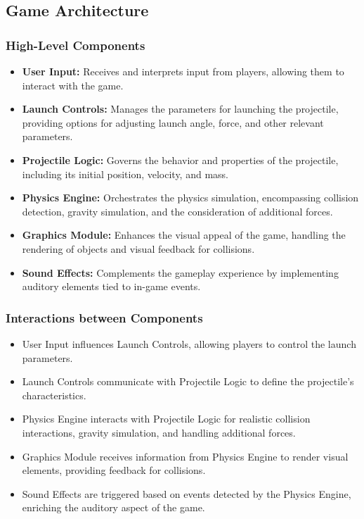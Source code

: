 \documentclass[12pt, titlepage]{article}
\begin{document}
\subsection{Game Architecture}
\subsubsection{High-Level Components}
\begin{itemize}
    \item \textbf{User Input:} Receives and interprets input from players, allowing them to interact with the game.
    \item \textbf{Launch Controls:} Manages the parameters for launching the projectile, providing options for adjusting launch angle, force, and other relevant parameters.
    \item \textbf{Projectile Logic:} Governs the behavior and properties of the projectile, including its initial position, velocity, and mass.
    \item \textbf{Physics Engine: } Orchestrates the physics simulation, encompassing collision detection, gravity simulation, and the consideration of additional forces.
    \item \textbf{Graphics Module:} Enhances the visual appeal of the game, handling the rendering of objects and visual feedback for collisions.
    \item \textbf{Sound Effects:} Complements the gameplay experience by implementing auditory elements tied to in-game events.
\end{itemize}

\subsubsection{Interactions between Components}
\begin{itemize}
    \item User Input influences Launch Controls, allowing players to control the launch parameters.
    \item Launch Controls communicate with Projectile Logic to define the projectile's characteristics.
    \item Physics Engine interacts with Projectile Logic for realistic collision interactions, gravity simulation, and handling additional forces.
    \item Graphics Module receives information from Physics Engine to render visual elements, providing feedback for collisions.
    \item Sound Effects are triggered based on events detected by the Physics Engine, enriching the auditory aspect of the game.
\end{itemize}
\end{document}
